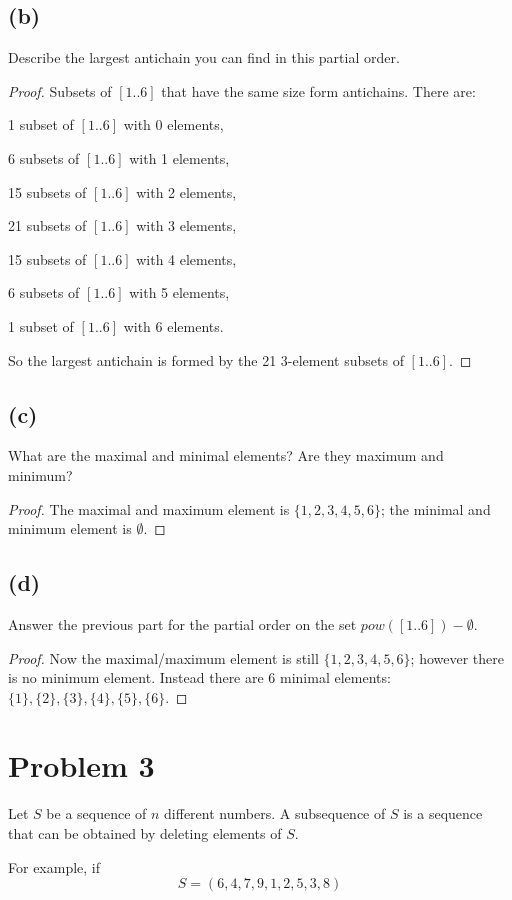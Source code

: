 \documentclass[14pt]{extarticle}
\begin{document}
\subsection{(b)}
Describe the largest antichain you can find in this partial order.
\begin{proof}
Subsets of $[1..6]$ that have the same size form antichains. There are:

1 subset of $[1..6]$ with 0 elements,

6 subsets of $[1..6]$ with 1 elements,

15 subsets of $[1..6]$ with 2 elements,

21 subsets of $[1..6]$ with 3 elements,

15 subsets of $[1..6]$ with 4 elements,

6 subsets of $[1..6]$ with 5 elements,

1 subset of $[1..6]$ with 6 elements.

So the largest antichain is formed by the 21 3-element subsets of $[1..6]$.
\end{proof}

\subsection{(c)}
What are the maximal and minimal elements? Are they maximum and minimum?
\begin{proof}
The maximal and maximum element is $\{1,2,3,4,5,6\}$; the minimal and minimum element is $\emptyset$.
\end{proof}

\subsection{(d)}
Answer the previous part for the partial order on the set $pow([1..6]) - \emptyset$.
\begin{proof}
Now the maximal/maximum element is still $\{1,2,3,4,5,6\}$; however there is no minimum element. Instead there are 6 minimal elements: $\{1\}, \{2\}, \{3\}, \{4\}, \{5\}, \{6\}$.
\end{proof}

\section{Problem 3}
Let $S$ be a sequence of $n$ different numbers. A subsequence of $S$ is a sequence that can be obtained by deleting elements of $S$.

For example, if
$$
S = (6, 4, 7, 9, 1, 2, 5, 3, 8)
$$
\end{document}
